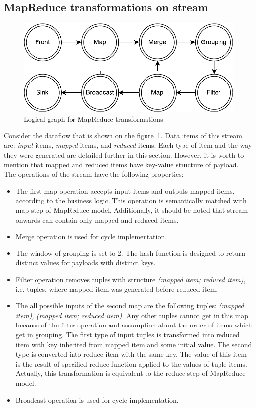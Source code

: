 \subsection{MapReduce transformations on stream}

\begin{figure}[htb]
  \centering
  \includegraphics[scale=0.5]{pics/mapreduce}
  \caption{Logical graph for MapReduce transformations}
  \label {mapreduce-graph-figure}
\end{figure}

Consider the dataflow that is shown on the figure~\ref{mapreduce-graph-figure}. Data items of this stream are: {\it input} items, {\it mapped} items, and {\it reduced} items. Each type of item and the way they were generated are detailed further in this section. However, it is worth to mention that mapped and reduced items have key-value structure of payload. The operations of the stream have the following properties:

\begin{itemize}
\item The first map operation accepts input items and outputs mapped items, according to the business logic. This operation is semantically matched with map step of MapReduce model. Additionally, it should be noted that stream onwards can contain only mapped and reduced items.
\item Merge operation is used for cycle implementation.
\item The window of grouping is set to 2. The hash function is designed to return distinct values for payloads with distinct keys.
\item Filter operation removes tuples with structure \textit{(mapped item; reduced item)}, i.e. tuples, where mapped item was generated before reduced item.
\item The all possible inputs of the second map are the following tuples: \textit{(mapped item), (mapped item; reduced item)}. Any other tuples cannot get in this map because of the filter operation and assumption about the order of items which get in grouping. The first type of input tuples is transformed into reduced item with key inherited from mapped item and some initial value.  The second type is converted into reduce item with the same key. The value of this item is the result of specified reduce function applied to the values of tuple items. Actually, this transformation is equivalent to the reduce step of MapReduce model.
\item Broadcast operation is used for cycle implementation.
\end{itemize}

